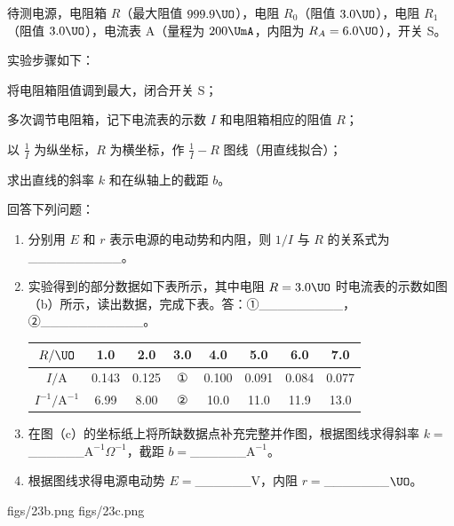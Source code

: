\documentclass[\gkver]{gaokaozhenti}
\begin{document}
\begin{enumerate}
待测电源，电阻箱 $R$（最大阻值 $999.9\UO$），电阻 $R_{0}$（阻值 $3.0\UO$），电阻 $R_{1}$（阻值 $3.0\UO$），电流表 A（量程为 $200\UmA$，内阻为 $R_{A}=6.0\UO$），开关 S。

实验步骤如下：
\begin{steps}
	\item
	将电阻箱阻值调到最大，闭合开关 S；
	\item
	多次调节电阻箱，记下电流表的示数 $I$ 和电阻箱相应的阻值 $R$；
	\item
	以 $\frac{1}{I}$ 为纵坐标，$R$ 为横坐标，作 $\frac{1}{I}-R$ 图线（用直线拟合）；
	\item
	求出直线的斜率 $k$ 和在纵轴上的截距 $b$。
\end{steps}

回答下列问题：
\begin{enumerate}
	\item
	分别用 $E$ 和 $r$ 表示电源的电动势和内阻，则 $1/I$ 与 $R$ 的关系式为\_\_\_\_\_\_\_\_\_\_。
	\item
	实验得到的部分数据如下表所示，其中电阻 $R=3.0\UO$ 时电流表的示数如图（b）所示，读出数据，完成下表。答：①\_\_\_\_\_\_\_\_\_，②\_\_\_\_\_\_\_\_\_\_\_。

\begin{center}
\begin{tabular}{|c|c|c|c|c|c|c|c|}
\hline
$R/\UO$ & 1.0 & 2.0 & 3.0 & 4.0 & 5.0 & 6.0 & 7.0 \\ \hline
$I/\mathrm{A}$ & 0.143 & 0.125 & ① & 0.100 & 0.091 & 0.084 & 0.077 \\ \hline
$I^{-1}/\mathrm{A}^{-1}$ & 6.99 & 8.00 & ② & 10.0 & 11.0 & 11.9 & 13.0 \\ \hline
\end{tabular}
\end{center}

	\item
	在图（c）的坐标纸上将所缺数据点补充完整并作图，根据图线求得斜率 $k=$\_\_\_\_\_\_$\mathrm{A}^{-1}\Omega^{-1}$，截距 $b=$\_\_\_\_\_\_$\mathrm{A}^{-1}$。
	\item
	根据图线求得电源电动势 $E=$\_\_\_\_\_\_$\mathrm{V}$，内阻 $r=$\_\_\_\_\_\_\_$\UO$。
\end{enumerate}
{figs/23b.png}
{figs/23c.png}
\end{enumerate}
\end{document}
